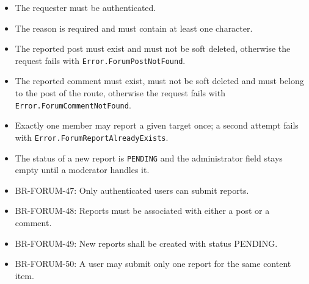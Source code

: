 \begin{itemize}[leftmargin=1.6em,topsep=3pt,itemsep=2pt,parsep=0pt,label=$\bullet$]
      \item The requester must be authenticated.
      \item The reason is required and must contain at least one character.
      \item The reported post must exist and must not be soft deleted, otherwise the
            request fails with \texttt{Error.ForumPostNotFound}.
      \item The reported comment must exist, must not be soft deleted and must belong to
            the post of the route, otherwise the request fails with
            \texttt{Error.ForumCommentNotFound}.
      \item Exactly one member may report a given target once; a second attempt fails with
            \texttt{Error.ForumReportAlreadyExists}.
      \item The status of a new report is \texttt{PENDING} and the administrator field
            stays empty until a moderator handles it.
\end{itemize}

\begin{itemize}[leftmargin=1.6em,topsep=3pt,itemsep=2pt,parsep=0pt,label=$\bullet$]\brrulelist
      \item BR-FORUM-47: Only authenticated users can submit reports.
      \item BR-FORUM-48: Reports must be associated with either a post or a comment.
      \item BR-FORUM-49: New reports shall be created with status PENDING.
      \item BR-FORUM-50: A user may submit only one report for the same content item.
\end{itemize}

